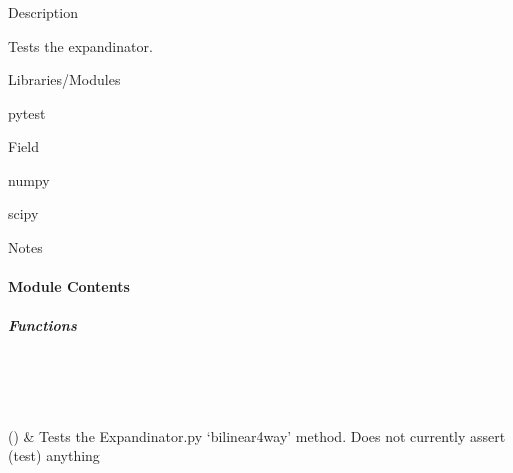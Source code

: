 \documentclass[letterpaper,10pt,english]{sphinxmanual}
\begin{document}
\subsubsection{}
\label{\detokenize{autoapi/tests/test_Expandinator/index:module-tests.test_Expandinator}}\label{\detokenize{autoapi/tests/test_Expandinator/index:tests-test-expandinator}}\label{\detokenize{autoapi/tests/test_Expandinator/index::doc}}
\sphinxAtStartPar
Description

\sphinxAtStartPar
Tests the expandinator.

\sphinxAtStartPar
Libraries/Modules

\sphinxAtStartPar
\sphinxhyphen{}pytest

\sphinxAtStartPar
\sphinxhyphen{}Field

\sphinxAtStartPar
\sphinxhyphen{}numpy

\sphinxAtStartPar
\sphinxhyphen{}scipy

\sphinxAtStartPar
Notes


\paragraph{Module Contents}
\label{\detokenize{autoapi/tests/test_Expandinator/index:module-contents}}

\subparagraph{Functions}
\label{\detokenize{autoapi/tests/test_Expandinator/index:functions}}

\begin{savenotes}\sphinxatlongtablestart\begin{longtable}[c]{}
\hline

\endfirsthead

%
{}\\
\hline

\endhead

\hline
{}\\
\endfoot

\endlastfoot

\sphinxAtStartPar
{\hyperref[\detokenize{autoapi/tests/test_Expandinator/index:tests.test_Expandinator.test_bilinear4way}]{}}()
&
\sphinxAtStartPar
Tests the Expandinator.py ‘bilinear4way’ method. Does not currently assert (test) anything
\\
\hline
\end{longtable}\sphinxatlongtableend\end{savenotes}
\end{document}
